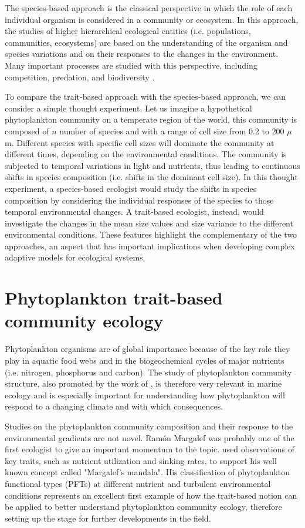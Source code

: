 The species-based approach is the classical perspective in which the role of each individual organism is considered in a community or ecosystem. In this approach, the studies of higher hierarchical ecological entities (i.e. populations, communities, ecosystems) are based on the understanding of the organism and species variations and on their responses to the changes in the environment. Many important processes are studied with this perspective, including competition, predation, and biodiversity \citep{Begon2006}. 

To compare the trait-based approach with the species-based approach, we can consider a simple thought experiment. Let us imagine a hypothetical phytoplankton community on a temperate region of the world, this community is composed of $n$ number of species and with a range of cell size from 0.2 to 200 $\mu$m. Different species with specific cell sizes will dominate the community at different times, depending on the environmental conditions. The community is subjected to temporal variations in light and nutrients, thus leading to continuous shifts in species composition (i.e. shifts in the dominant cell size). In this thought experiment, a species-based ecologist would study the shifts in species composition by considering the individual responses of the species to those temporal environmental changes. A trait-based ecologist, instead, would investigate the changes in the mean size values and size variance to the different environmental conditions. These features highlight the complementary of the two approaches, an aspect that has important implications when developing complex adaptive models for ecological systems.

\section{Phytoplankton trait-based community ecology}
Phytoplankton organisms are of global importance because of the key role they play in aquatic food webs and in the biogeochemical cycles of major nutrients (i.e. nitrogen, phosphorus and carbon). The study of phytoplankton community structure, also promoted by the work of \citet{Falkowski1998}, is therefore very relevant in marine ecology and is especially important for understanding how phytoplankton will respond to a changing climate and with which consequences.

Studies on the phytoplankton community composition and their response to the environmental gradients are not novel. Ramón Margalef was probably one of the first ecologist to give an important momentum to the topic.  \citep{Margalef1978} used observations of key traits, such as nutrient utilization and sinking rates, to support his well known concept called "Margalef's mandala". His classification of phytoplankton functional types (PFTs) at different nutrient and turbulent environmental conditions represents an excellent first example of how the trait-based notion can be applied to better understand phytoplankton community ecology, therefore setting up the stage for further developments in the field.

